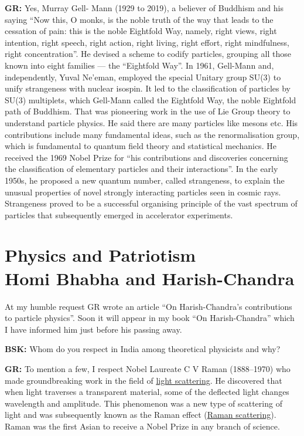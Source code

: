 \textbf{GR:} Yes, Murray Gell- Mann (1929 to 2019), a believer of Buddhism and his saying  ``Now this, O monks, is the noble truth of the way that leads to the cessation of pain: this is the noble Eightfold Way, namely, right views, right intention, right speech, right action, right living, right effort, right mindfulness, right concentration”. He devised a scheme to codify particles, grouping all those known into eight families — the “Eightfold Way”. In 1961, Gell-Mann and, independently, Yuval Ne’eman, employed the special Unitary group SU(3) to unify strangeness with nuclear isospin. It led to the classification of particles by SU(3) multiplets, which Gell-Mann called the Eightfold Way, the noble Eightfold path of Buddhism. That was pioneering work in the use of Lie Group theory to understand particle physics. He said there are many particles like mesons etc. His contributions include many   fundamental ideas, such as the renormalisation group, which is fundamental to quantum field theory and statistical mechanics.  He received the 1969 Nobel Prize for “his contributions and discoveries concerning the classification of elementary particles and their interactions”. In the early 1950s, he proposed a new quantum number, called strangeness, to explain the unusual properties of novel strongly interacting particles seen in cosmic rays. Strangeness proved to be a successful organising principle of the vast spectrum of particles that subsequently emerged in accelerator experiments.

\section*{Physics and Patriotism\\ {\large Homi Bhabha and Harish-Chandra}}

At my humble request GR wrote an article \cite{chap17-key03GR} “On Harish-Chandra's contributions to particle physics”. Soon it will appear in my book “On Harish-Chandra” which I have informed him just before his passing away.

\textbf{BSK:} Whom do you respect in India among theoretical physicists and why?

\textbf{GR:} To mention a few, I respect Nobel Laureate C V Raman (1888--1970) who made groundbreaking work in the field of \underline{light scattering}. He discovered that when light traverses a transparent material, some of the deflected light changes wavelength and amplitude. This phenomenon was a new type of scattering of light and was subsequently known as the Raman effect (\underline{Raman scattering}). Raman was the first Asian to receive a Nobel Prize in any branch of science.

